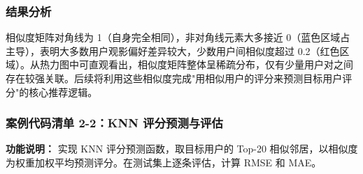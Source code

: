 \documentclass[12pt,a4paper]{ctexart}
\begin{document}
\subsubsection{结果分析}

相似度矩阵对角线为 1（自身完全相同），非对角线元素大多接近 0（蓝色区域占主导），表明大多数用户观影偏好差异较大，少数用户间相似度超过 0.2（红色区域）。从热力图中可直观看出，相似度矩阵整体呈稀疏分布，仅有少量用户对之间存在较强关联。后续将利用这些相似度完成"用相似用户的评分来预测目标用户评分"的核心推荐逻辑。

\subsubsection{案例代码清单 2-2：KNN 评分预测与评估}

\textbf{功能说明：} 实现 KNN 评分预测函数，取目标用户的 Top-20 相似邻居，以相似度为权重加权平均预测评分。在测试集上逐条评估，计算 RMSE 和 MAE。
\end{document}
